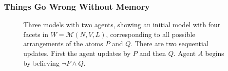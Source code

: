 \documentclass{beamer}
\newcommand{\M}{\mathcal{M}}
\begin{document}
\begin{frame}[fragile]
	\frametitle{Things Go Wrong Without Memory}
	\begin{figure}[htbp]
		\begin{center}
			\caption{Three models with two agents, showing an initial model with four facets in $W=\M(N,V,L)$, corresponding to all possible arrangements of the atoms $P$ and $Q$. There are two sequential updates. First the agent updates by $P$ and then $Q$. Agent $A$ begins by believing $\neg P\wedge Q$.}\label{2fgr:mainex4}
			
		\end{center}
	\end{figure}
\end{frame}
\end{document}
